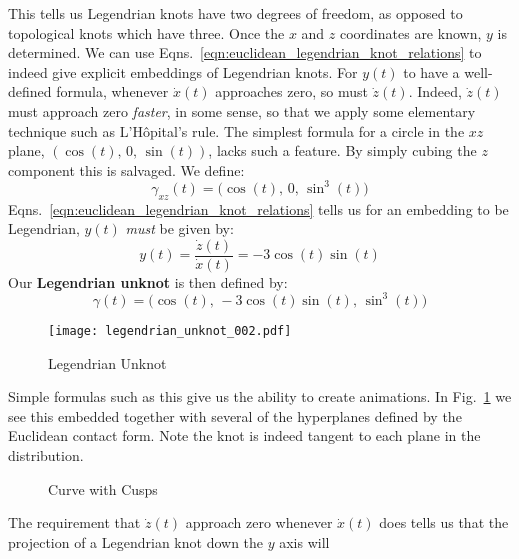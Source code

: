     This tells us Legendrian knots have two degrees of freedom, as opposed to
    topological knots which have three. Once the $x$ and $z$ coordinates are
    known, $y$ is determined. We can use
    Eqns.~\ref{eqn:euclidean_legendrian_knot_relations} to indeed give explicit
    embeddings of Legendrian knots. For $y(t)$ to have a well-defined formula,
    whenever $\dot{x}(t)$ approaches zero, so must $\dot{z}(t)$. Indeed,
    $\dot{z}(t)$ must approach zero \textit{faster}, in some sense, so that
    we apply some elementary technique such as L'H\^{o}pital's rule. The
    simplest formula for a circle in the $xz$ plane,
    $(\cos(t),\,0,\,\sin(t))$, lacks such a feature. By simply
    cubing the $z$ component this is salvaged. We define:
    \begin{equation}
        \gamma_{xz}(t)=\big(\cos(t),\,0,\,\sin^{3}(t)\big)
    \end{equation}
    Eqns.~\ref{eqn:euclidean_legendrian_knot_relations} tells us for an
    embedding to be Legendrian, $y(t)$ \textit{must} be given by:
    \begin{equation}
        y(t)=\frac{\dot{z}(t)}{\dot{x}(t)}=-3\cos(t)\sin(t)
    \end{equation}
    Our \textbf{Legendrian unknot} is then defined by:
    \begin{equation}
        \gamma(t)=\big(
            \cos(t),\,
            -3\cos(t)\sin(t),\,
            \sin^{3}(t)
        \big)
    \end{equation}
    \begin{figure}
        \centering
        \texttt{[image: legendrian\_unknot\_002.pdf]}
        \caption{Legendrian Unknot}
        \label{fig:legendrian_unknot_002}
    \end{figure}
    Simple formulas such as this give us the ability to create animations. In
    Fig.~\ref{fig:legendrian_unknot_002} we see this embedded together with
    several of the hyperplanes defined by the Euclidean contact form. Note the
    knot is indeed tangent to each plane in the distribution.
    \par\hfill\par
    \begin{figure}
        \centering
        \caption{Curve with Cusps}
        \label{fig:cusps_in_the_plane_001}
    \end{figure}
    The requirement that $\dot{z}(t)$ approach zero whenever $\dot{x}(t)$ does
    tells us that the projection of a Legendrian knot down the $y$ axis will
